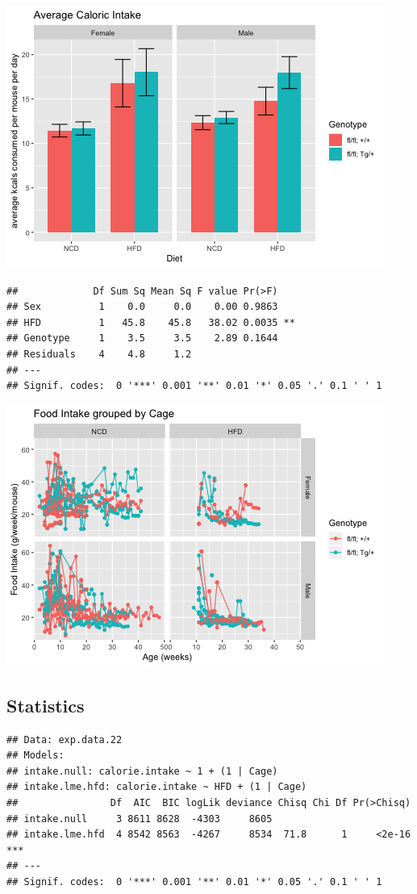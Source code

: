 \documentclass[]{article}
\begin{document}
\includegraphics{figures/weekly-intake-plots-4.png}

\begin{verbatim}
##             Df Sum Sq Mean Sq F value Pr(>F)   
## Sex          1    0.0     0.0    0.00 0.9863   
## HFD          1   45.8    45.8   38.02 0.0035 **
## Genotype     1    3.5     3.5    2.89 0.1644   
## Residuals    4    4.8     1.2                  
## ---
## Signif. codes:  0 '***' 0.001 '**' 0.01 '*' 0.05 '.' 0.1 ' ' 1
\end{verbatim}

\includegraphics{figures/weekly-lineplot-food-intake-by-cage-1.png}

\subsection{Statistics}\label{statistics}

\begin{verbatim}
## Data: exp.data.22
## Models:
## intake.null: calorie.intake ~ 1 + (1 | Cage)
## intake.lme.hfd: calorie.intake ~ HFD + (1 | Cage)
##                Df  AIC  BIC logLik deviance Chisq Chi Df Pr(>Chisq)    
## intake.null     3 8611 8628  -4303     8605                            
## intake.lme.hfd  4 8542 8563  -4267     8534  71.8      1     <2e-16 ***
## ---
## Signif. codes:  0 '***' 0.001 '**' 0.01 '*' 0.05 '.' 0.1 ' ' 1
\end{verbatim}
\end{document}

